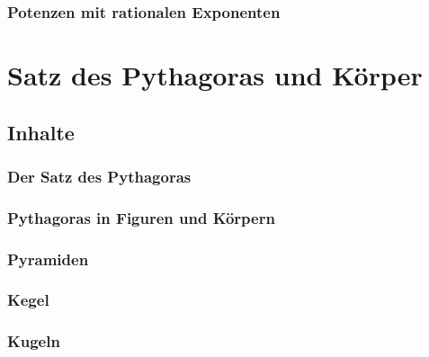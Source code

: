 \documentclass{article}
\begin{document}
\subsubsection*{Potenzen mit rationalen Exponenten}
\newpage
\section{Satz des Pythagoras und Körper}
\subsection{Inhalte}
\subsubsection*{Der Satz des Pythagoras}
\subsubsection*{Pythagoras in Figuren und Körpern}
\subsubsection*{Pyramiden}
\subsubsection*{Kegel}
\subsubsection*{Kugeln}
\end{document}
